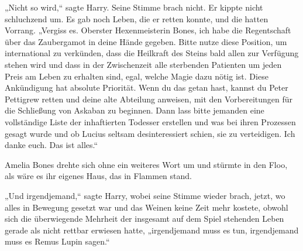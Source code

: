 „Nicht so wird,“ sagte Harry. Seine Stimme brach nicht. Er kippte nicht schluchzend um.
Es gab noch Leben, die er retten konnte, und die hatten Vorrang. „Vergiss es. Oberster Hexenmeisterin Bones, ich habe die Regentschaft über das Zaubergamot in deine Hände gegeben. Bitte nutze diese Position, um international zu verkünden, dass die Heilkraft des Steins bald allen zur Verfügung stehen wird und dass in der Zwischenzeit alle sterbenden Patienten um jeden Preis am Leben zu erhalten sind, egal, welche Magie dazu nötig ist. Diese Ankündigung hat absolute Priorität. Wenn du das getan hast, kannst du Peter Pettigrew retten und deine alte Abteilung anweisen, mit den Vorbereitungen für die Schließung von Askaban zu beginnen. Dann lass bitte jemanden eine vollständige Liste der inhaftierten Todesser erstellen und was bei ihren Prozessen gesagt wurde und ob Lucius seltsam desinteressiert schien, sie zu verteidigen. Ich danke euch. Das ist alles.“

Amelia Bones drehte sich ohne ein weiteres Wort um und stürmte in den Floo, als wäre es ihr eigenes Haus, das in Flammen stand.

„Und irgendjemand,“ sagte Harry, wobei seine Stimme wieder brach, jetzt, wo alles in Bewegung gesetzt war und das Weinen keine Zeit mehr kostete, obwohl sich die überwiegende Mehrheit der insgesamt auf dem Spiel stehenden Leben gerade als nicht rettbar erwiesen hatte, „irgendjemand muss es tun, irgendjemand muss es Remus Lupin sagen.“

